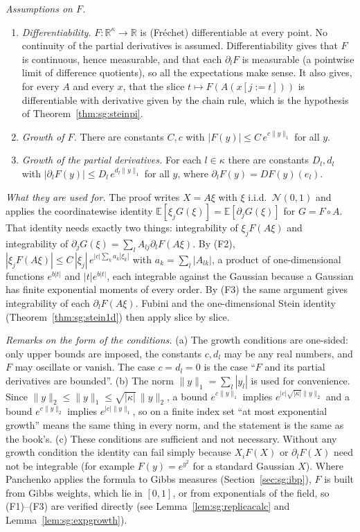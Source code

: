 \begin{remark}
\emph{Assumptions on $F$.}
\begin{enumerate}
\item[(F1)] \emph{Differentiability.} $F:\mathbb R^\kappa\to\mathbb R$ is (Fr\'echet) differentiable at every point.
  No continuity of the partial derivatives is assumed. Differentiability gives that $F$ is continuous, hence measurable, and
  that each $\partial_lF$ is measurable (a pointwise limit of difference quotients), so all the expectations make sense.
  It also gives, for every $A$ and every $x$, that the slice $t\mapsto F(A(x[j:=t]))$ is differentiable with derivative
  given by the chain rule, which is the hypothesis of Theorem~\ref{thm:sg:steinpi}.
\item[(F2)] \emph{Growth of $F$.} There are constants $C,c$ with $|F(y)|\le C\,e^{c\|y\|_1}$ for all $y$.
\item[(F3)] \emph{Growth of the partial derivatives.} For each $l\in\kappa$ there are constants $D_l,d_l$ with
  $|\partial_lF(y)|\le D_l\,e^{d_l\|y\|_1}$ for all $y$, where $\partial_lF(y)=DF(y)(e_l)$.
\end{enumerate}
\emph{What they are used for.} The proof writes $X=A\xi$ with $\xi$ i.i.d.\ $\mathcal N(0,1)$ and applies the coordinatewise
identity $\mathbb E[\xi_jG(\xi)]=\mathbb E[\partial_jG(\xi)]$ for $G=F\circ A$. That identity needs exactly two things:
integrability of $\xi_jF(A\xi)$ and integrability of $\partial_jG(\xi)=\sum_lA_{lj}\partial_lF(A\xi)$. By (F2),
$|\xi_jF(A\xi)|\le C\,|\xi_j|\,e^{|c|\sum_ka_k|\xi_k|}$ with $a_k=\sum_l|A_{lk}|$, a product of one-dimensional functions
$e^{b|t|}$ and $|t|e^{b|t|}$, each integrable against the Gaussian because a Gaussian has finite exponential moments of every
order. By (F3) the same argument gives integrability of each $\partial_lF(A\xi)$. Fubini and the one-dimensional Stein identity
(Theorem~\ref{thm:sg:stein1d}) then apply slice by slice.

\emph{Remarks on the form of the conditions.}
(a) The growth conditions are one-sided: only upper bounds are imposed, the constants $c,d_l$ may be any real numbers, and
$F$ may oscillate or vanish. The case $c=d_l=0$ is the case ``$F$ and its partial derivatives are bounded''.
(b) The norm $\|y\|_1=\sum_l|y_l|$ is used for convenience. Since $\|y\|_2\le\|y\|_1\le\sqrt{|\kappa|}\,\|y\|_2$, a bound
$e^{c\|y\|_1}$ implies $e^{|c|\sqrt{|\kappa|}\|y\|_2}$ and a bound $e^{c\|y\|_2}$ implies $e^{|c|\|y\|_1}$, so on a finite
index set ``at most exponential growth'' means the same thing in every norm, and the statement is the same as the book's.
(c) These conditions are sufficient and not necessary. Without any growth condition the identity can fail simply
because $X_iF(X)$ or $\partial_lF(X)$ need not be integrable (for example $F(y)=e^{y^2}$ for a standard Gaussian $X$).
Where Panchenko applies the formula to Gibbs measures (Section~\ref{sec:sg:ibp}), $F$ is built from Gibbs weights, which lie in $[0,1]$,
or from exponentials of the field, so (F1)--(F3) are verified directly (see Lemma~\ref{lem:sg:replicacalc} and Lemma~\ref{lem:sg:expgrowth}).
\end{remark}

